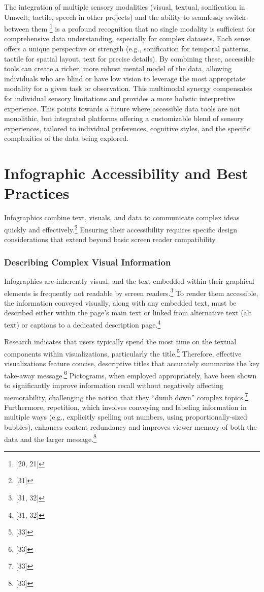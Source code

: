 The integration of multiple sensory modalities (visual, textual, sonification in Umwelt; tactile, speech in other projects) and the ability to seamlessly switch between them \footnote{[20, 21]} is a profound recognition that no single modality is sufficient for comprehensive data understanding, especially for complex datasets. Each sense offers a unique perspective or strength (e.g., sonification for temporal patterns, tactile for spatial layout, text for precise details). By combining these, accessible tools can create a richer, more robust mental model of the data, allowing individuals who are blind or have low vision to leverage the most appropriate modality for a given task or observation. This multimodal synergy compensates for individual sensory limitations and provides a more holistic interpretive experience. This points towards a future where accessible data tools are not monolithic, but integrated platforms offering a customizable blend of sensory experiences, tailored to individual preferences, cognitive styles, and the specific complexities of the data being explored.

\section{Infographic Accessibility and Best Practices}
Infographics combine text, visuals, and data to communicate complex ideas quickly and effectively.\footnote{[31]} Ensuring their accessibility requires specific design considerations that extend beyond basic screen reader compatibility.

\subsubsection{Describing Complex Visual Information}
Infographics are inherently visual, and the text embedded within their graphical elements is frequently not readable by screen readers.\footnote{[31, 32]} To render them accessible, the information conveyed visually, along with any embedded text, must be described either within the page's main text or linked from alternative text (alt text) or captions to a dedicated description page.\footnote{[31, 32]}

Research indicates that users typically spend the most time on the textual components within visualizations, particularly the title.\footnote{[33]} Therefore, effective visualizations feature concise, descriptive titles that accurately summarize the key take-away message.\footnote{[33]} Pictograms, when employed appropriately, have been shown to significantly improve information recall without negatively affecting memorability, challenging the notion that they ``dumb down'' complex topics.\footnote{[33]} Furthermore, repetition, which involves conveying and labeling information in multiple ways (e.g., explicitly spelling out numbers, using proportionally-sized bubbles), enhances content redundancy and improves viewer memory of both the data and the larger message.\footnote{[33]}

